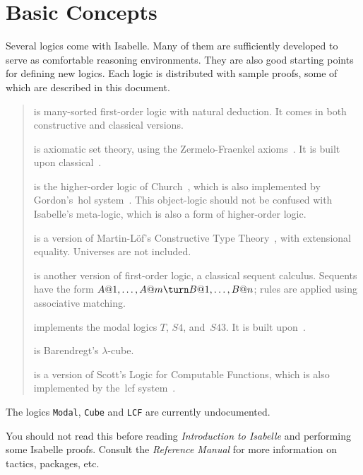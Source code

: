 \chapter{Basic Concepts}
Several logics come with Isabelle.  Many of them are sufficiently developed
to serve as comfortable reasoning environments.  They are also good
starting points for defining new logics.  Each logic is distributed with
sample proofs, some of which are described in this document.

\begin{quote}
{} is many-sorted first-order logic with natural
deduction.  It comes in both constructive and classical versions.

{} is axiomatic set theory, using the Zermelo-Fraenkel
axioms~\cite{suppes72}.  It is built upon classical~\FOL{}.
 
{} is the higher-order logic of Church~\cite{church40},
which is also implemented by Gordon's~{\sc hol} system~\cite{mgordon88a}.  This
object-logic should not be confused with Isabelle's meta-logic, which is
also a form of higher-order logic.
 
{} is a version of Martin-L\"of's Constructive Type
Theory~\cite{nordstrom90}, with extensional equality.  Universes are not
included.
 
{} is another version of first-order logic, a classical
sequent calculus.  Sequents have the form $A@1,\ldots,A@m\turn
B@1,\ldots,B@n$; rules are applied using associative matching.

{} implements the modal logics $T$, $S4$, and~$S43$.  It
is built upon~\LK{}.

{} is Barendregt's $\lambda$-cube.

{} is a version of Scott's Logic for Computable Functions,
which is also implemented by the~{\sc lcf} system~\cite{paulson87}.
\end{quote}
The logics {\tt Modal}, {\tt Cube} and {\tt LCF} are currently undocumented.

You should not read this before reading {\em Introduction to Isabelle\/}
and performing some Isabelle proofs.  Consult the {\em Reference Manual}
for more information on tactics, packages, etc.


